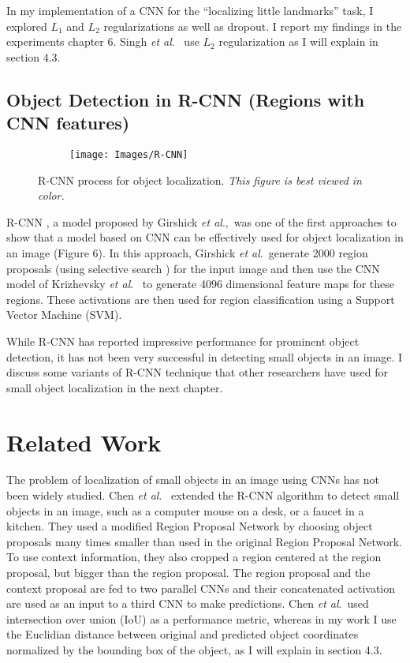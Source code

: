 \documentclass [11pt,letterpaper ,twoside ,openany ]{report}
\begin{document}
    In my implementation of a CNN for the ``localizing little landmarks'' task, I explored \(L_1\) and \(L_2\) regularizations as well as dropout. I report my findings in the experiments chapter 6. Singh \textit{et al}.\ \cite{Singh_2016_CVPR} use \(L_2\) regularization as I will explain in section 4.3.

     \section{Object Detection in R-CNN (Regions with CNN features)}

    \begin{figure}[h]
      \centering
      \begin{subfigure}[b]{0.70\linewidth}
        \texttt{[image: Images/R-CNN]}
      \end{subfigure}
      \caption{R-CNN \cite{girshick2014rich} process for object localization. \textit{This figure is best viewed in color.}}
      \label{fig:r-cnn}
    \end{figure}    

     R-CNN \cite{girshick2014rich}, a model proposed by Girshick \textit{et al}.,\ was one of the first approaches to show that a model based on CNN can be effectively used for object localization in an image (Figure 6). In this approach, Girshick \textit{et al}.\ generate 2000 region proposals (using selective search \cite{uijlings2013selective}) for the input image and then use the CNN model of Krizhevsky \textit{et al}.\ \cite{krizhevsky2012imagenet} to generate 4096 dimensional feature maps for these regions. These activations are then used for region classification using a Support Vector Machine (SVM).

     While R-CNN has reported impressive performance for prominent object detection, it has not been very successful in detecting small objects in an image. I discuss some variants of R-CNN technique that other researchers have used for small object localization \cite{chen2016r, eggert2017improving} in the next chapter.

    \chapter{Related Work}
    \doublespacing
    The problem of localization of small objects in an image using CNNs has not been widely studied. Chen \textit{et al}.\ \cite{chen2016r} extended the R-CNN algorithm to detect small objects in an image, such as a computer mouse on a desk, or a faucet in a kitchen. They used a modified Region Proposal Network \cite{ren2015faster} by choosing object proposals many times smaller than used in the original Region Proposal Network. To use context information, they also cropped a region centered at the region proposal, but bigger than the region proposal. The region proposal and the context proposal are fed to two parallel CNNs and their concatenated activation are used as an input to a third CNN to make predictions. Chen \textit{et al}.\ used intersection over union (IoU) as a performance metric, whereas in my work I use the Euclidian distance between original and predicted object coordinates normalized by the bounding box of the object, as I will explain in section 4.3. 
\end{document}
